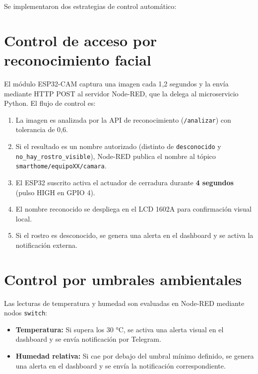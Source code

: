 \documentclass[12pt, a4paper]{report}
\begin{document}
Se implementaron dos estrategias de control automático:

\section*{Control de acceso por reconocimiento facial}

El módulo ESP32-CAM captura una imagen cada 1{,}2 segundos y la envía mediante HTTP POST al servidor Node-RED, que la delega al microservicio Python. El flujo de control es:

\begin{enumerate}
    \item La imagen es analizada por la API de reconocimiento (\texttt{/analizar}) con tolerancia de 0{,}6.
    \item Si el resultado es un nombre autorizado (distinto de \texttt{desconocido} y \texttt{no\_hay\_rostro\_visible}), Node-RED publica el nombre al tópico \texttt{smarthome/equipoXX/camara}.
    \item El ESP32 suscrito activa el actuador de cerradura durante \textbf{4 segundos} (pulso HIGH en GPIO 4).
    \item El nombre reconocido se despliega en el LCD 1602A para confirmación visual local.
    \item Si el rostro es desconocido, se genera una alerta en el dashboard y se activa la notificación externa.
\end{enumerate}

\section*{Control por umbrales ambientales}

Las lecturas de temperatura y humedad son evaluadas en Node-RED mediante nodos \texttt{switch}:

\begin{itemize}
    \item \textbf{Temperatura:} Si supera los 30 °C, se activa una alerta visual en el dashboard y se envía notificación por Telegram.
    \item \textbf{Humedad relativa:} Si cae por debajo del umbral mínimo definido, se genera una alerta en el dashboard y se envía la notificación correspondiente.
\end{itemize}

\end{document}
